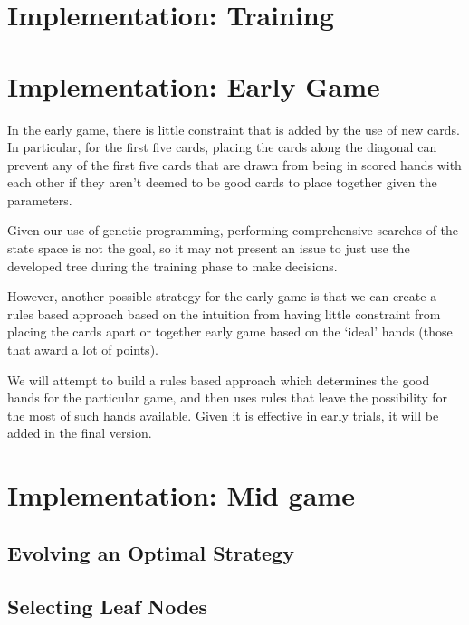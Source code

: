 \documentclass[twoside]{article}
\begin{document}
\begin{multicols}{2}

\section{Implementation: Training}



\section{Implementation: Early Game}
In the early game, there is little constraint that is added by the use of new cards. In particular, for the first five cards, placing the cards along the diagonal can prevent any of the first five cards that are drawn from being in scored hands with each other if they aren't deemed to be good cards to place together given the parameters.

Given our use of genetic programming, performing comprehensive searches of the state space is not the goal, so it may not present an issue to just use the developed tree during the training phase to make decisions.

However, another possible strategy for the early game is that we can create a rules based approach based on the intuition from having little constraint from placing the cards apart or together early game based on the `ideal' hands (those that award a lot of points).

We will attempt to build a rules based approach which determines the good hands for the particular game, and then uses rules that leave the possibility for the most of such hands available. Given it is effective in early trials, it will be added in the final version.

\section{Implementation: Mid game}

\subsection{Evolving an Optimal Strategy}

\subsection{Selecting Leaf Nodes}


\end{multicols}
\end{document}
